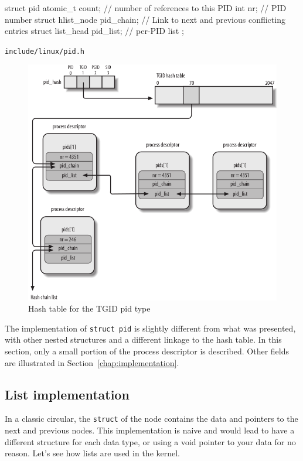 \documentclass[10pt, oneside]{book}
\begin{document}
\begin{code}
struct pid {
        atomic_t count; // number of references to this PID
  int nr; // PID number
  struct hlist_node pid_chain; // Link to next and previous conflicting entries
  struct list_head pid_list;  // per-PID list
};
\end{code}
\verb|include/linux/pid.h|

\begin{figure}[ht]
\includegraphics[width=\textwidth]{images/pidhash2.png}
\caption{Hash table for the TGID pid type}
\label{img:pidhash2}
\end{figure}

The implementation of \verb|struct pid| is slightly different from what was presented, with other nested structures and a different linkage to the hash table. %
In this section, only a small portion of the process descriptor is described. Other fields are illustrated in Section~\ref{chap:implementation}.



\subsection{List implementation}
In a classic circular, the \texttt{struct} of the node contains the data and pointers to the next and previous nodes. This implementation is naive and would lead to have a different structure for each data type, or using a void pointer to your data for no reason. Let's see how lists are used in the kernel.
\end{document}
